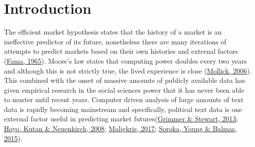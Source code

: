 \documentclass[11pt,preprint, authoryear]{elsarticle}
\numberwithin{equation}{section}
\numberwithin{figure}{section}
\numberwithin{table}{section}
\begin{document}
\headsep 35pt %




\listoffigures
\listoftables
\newpage

\hypertarget{introduction}{%
\section{\texorpdfstring{Introduction
\label{Introduction}}{Introduction }}\label{introduction}}

The efficient market hypothesis states that the history of a market is
an ineffective predictor of its future, nonetheless there are many
iterations of attempts to predict markets based on their own histories
and external factors (\protect\hyperlink{ref-famaEfficient}{Fama,
1965}). Moore's law states that computing power doubles every two years
and although this is not strictly true, the lived experience is close
(\protect\hyperlink{ref-mollick2006establishing}{Mollick, 2006}). This
combined with the onset of massive amounts of publicly available data
has given empirical research in the social sciences power that it has
never been able to muster until recent years. Computer driven analysis
of large amounts of text data is rapidly becoming mainstream and
specifically, political text data is one external factor useful in
predicting market
futures(\protect\hyperlink{ref-grimmer2013text}{Grimmer \& Stewart,
2013}; \protect\hyperlink{ref-hayo2008communicating}{Hayo, Kutan \&
Neuenkirch, 2008};
\protect\hyperlink{ref-maligkris2017political}{Maligkris, 2017};
\protect\hyperlink{ref-soroka2015bad}{Soroka, Young \& Balmas, 2015}).
\end{document}
